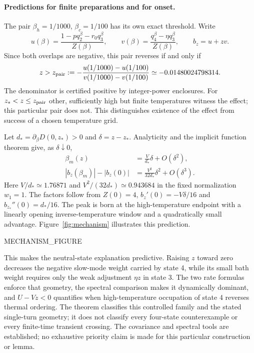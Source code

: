 \paragraph{Predictions for finite preparations and for onset.}
The pair $\beta_h=1/1000$, $\beta_c=1/100$ has its own exact threshold. Write
\[
u(\beta)=\frac{1-pq_2^\beta-r_0q_3^\beta}{Z(\beta)},\qquad
v(\beta)=\frac{q_4^\beta-\eta q_3^\beta}{Z(\beta)},\qquad b_z=u+zv.
\]
Since both overlaps are negative, this pair reverses if and only if
\[
z>z_{\rm pair}:=-\frac{u(1/1000)-u(1/100)}{v(1/1000)-v(1/100)}
\simeq-0.01480024798314.
\]
The denominator is certified positive by integer-power enclosures. For $z_*<z\leq z_{\rm pair}$ other, sufficiently high but finite temperatures witness the effect; this particular pair does not. This distinguishes existence of the effect from success of a chosen temperature grid.

Let $d_*=\partial_\beta D(0,z_*)>0$ and $\delta=z-z_*$. Analyticity and the implicit function theorem give, as $\delta\downarrow0$,
\begin{align*}
\beta_m(z)&=\frac{V}{d_*}\delta+O(\delta^2),\\
|b_z(\beta_m)|-|b_z(0)|&=\frac{V^2}{32d_*}\delta^2+O(\delta^3).
\end{align*}
Here $V/d_*\simeq1.76871$ and $V^2/(32d_*)\simeq0.943684$ in the fixed normalization $w_1=1$. The factors follow from $Z(0)=4$, $b_z'(0)=-V\delta/16$ and $b_{z_*}''(0)=d_*/16$. The peak is born at the high-temperature endpoint with a linearly opening inverse-temperature window and a quadratically small advantage. Figure~\ref{fig:mechanism} illustrates this prediction.

MECHANISM_FIGURE

This makes the neutral-state explanation predictive. Raising $z$ toward zero decreases the negative slow-mode weight carried by state 4, while its small bath weight requires only the weak adjustment $\eta z$ in state 3. The two rate formulas enforce that geometry, the spectral comparison makes it dynamically dominant, and $U-Vz<0$ quantifies when high-temperature occupation of state 4 reverses thermal ordering. The theorem classifies this controlled family and the stated single-turn geometry; it does not classify every four-state counterexample or every finite-time transient crossing. The covariance and spectral tools are established; no exhaustive priority claim is made for this particular construction or lemma.

